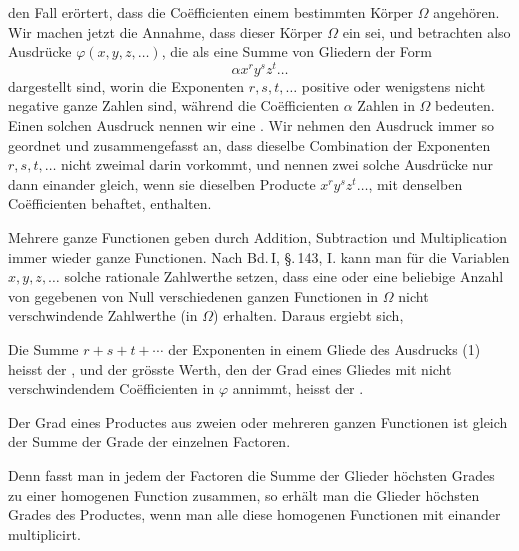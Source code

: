 
den Fall er\"ortert, dass die Co\"efficienten einem bestimmten K\"orper
$\Omega$ angeh\"oren. Wir machen jetzt die Annahme, dass dieser K\"orper
$\Omega$ ein  sei, und betrachten also
Ausdr\"ucke $\varphi(x, y, z, \ldots)$, die als eine Summe von Gliedern der
Form
\[
\alpha x^r y^s z^t \ldots
\]
dargestellt sind, worin die Exponenten $r, s, t, \ldots$ positive oder
wenigstens nicht negative ganze Zahlen sind, w\"ahrend die Coëfficienten
$\alpha$ Zahlen in $\Omega$ bedeuten. Einen solchen Ausdruck
nennen wir eine . Wir nehmen den
Ausdruck immer so geordnet und zusammengefasst an, dass dieselbe
Combination der Exponenten $r, s, t, \ldots$ nicht zweimal darin vorkommt,
und nennen zwei solche Ausdr\"ucke nur dann einander gleich, wenn sie
dieselben Producte $x^r y^s z^t \ldots$, mit denselben Coëfficienten
behaftet, enthalten. 

Mehrere ganze Functionen geben durch Addition, Subtraction und
Multiplication immer wieder ganze Functionen. Nach Bd.\,I, \S.\,143, I. kann
man f\"ur die Variablen $x, y, z, \ldots$ solche rationale Zahlwerthe
setzen, dass eine oder eine beliebige Anzahl von gegebenen von Null
verschiedenen ganzen Functionen in $\Omega$ nicht verschwindende Zahlwerthe
(in $\Omega$) erhalten. Daraus ergiebt sich, 

Die Summe $r + s + t + \cdots$ der Exponenten in einem Gliede des Ausdrucks
(1) heisst der , und der gr\"osste Werth, den
der Grad eines Gliedes mit nicht verschwindendem Coëfficienten in $\varphi$
annimmt, heisst der .

Der Grad eines Productes aus zweien oder mehreren ganzen Functionen ist
gleich der Summe der Grade der einzelnen Factoren.

Denn fasst man in jedem der Factoren die Summe der Glieder h\"ochsten
Grades zu einer homogenen Function zusammen, so erh\"alt man die Glieder
h\"ochsten Grades des Productes, wenn man alle diese homogenen Functionen
mit einander multiplicirt.
